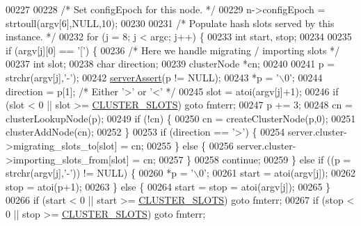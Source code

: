\begin{DoxyCode}
{{00227 
00228         \textcolor{comment}{/* Set configEpoch for this node. */}
00229         n->configEpoch = strtoull(argv[6],NULL,10);
00230 
00231         \textcolor{comment}{/* Populate hash slots served by this instance. */}
00232         \textcolor{keywordflow}{for} (j = 8; j < argc; j++) \{
00233             \textcolor{keywordtype}{int} start, stop;
00234 
00235             \textcolor{keywordflow}{if} (argv[j][0] == \textcolor{stringliteral}{'['}) \{
00236                 \textcolor{comment}{/* Here we handle migrating / importing slots */}
00237                 \textcolor{keywordtype}{int} slot;
00238                 \textcolor{keywordtype}{char} direction;
00239                 clusterNode *cn;
00240 
00241                 p = strchr(argv[j],\textcolor{stringliteral}{'-'});
00242                 \hyperlink{server_8h_a88114b5169b4c382df6b56506285e56a}{serverAssert}(p != NULL);
00243                 *p = \textcolor{stringliteral}{'\(\backslash\)0'};
00244                 direction = p[1]; \textcolor{comment}{/* Either '>' or '<' */}
00245                 slot = atoi(argv[j]+1);
00246                 \textcolor{keywordflow}{if} (slot < 0 || slot >= \hyperlink{cluster_8h_aa3e2cb951eebb16725ecc3f5beefd9fd}{CLUSTER\_SLOTS}) \textcolor{keywordflow}{goto} fmterr;
00247                 p += 3;
00248                 cn = clusterLookupNode(p);
00249                 \textcolor{keywordflow}{if} (!cn) \{
00250                     cn = createClusterNode(p,0);
00251                     clusterAddNode(cn);
00252                 \}
00253                 \textcolor{keywordflow}{if} (direction == \textcolor{stringliteral}{'>'}) \{
00254                     server.cluster->migrating\_slots\_to[slot] = cn;
00255                 \} \textcolor{keywordflow}{else} \{
00256                     server.cluster->importing\_slots\_from[slot] = cn;
00257                 \}
00258                 \textcolor{keywordflow}{continue};
00259             \} \textcolor{keywordflow}{else} \textcolor{keywordflow}{if} ((p = strchr(argv[j],\textcolor{stringliteral}{'-'})) != NULL) \{
00260                 *p = \textcolor{stringliteral}{'\(\backslash\)0'};
00261                 start = atoi(argv[j]);
00262                 stop = atoi(p+1);
00263             \} \textcolor{keywordflow}{else} \{
00264                 start = stop = atoi(argv[j]);
00265             \}
00266             \textcolor{keywordflow}{if} (start < 0 || start >= \hyperlink{cluster_8h_aa3e2cb951eebb16725ecc3f5beefd9fd}{CLUSTER\_SLOTS}) \textcolor{keywordflow}{goto} fmterr;
00267             \textcolor{keywordflow}{if} (stop < 0 || stop >= \hyperlink{cluster_8h_aa3e2cb951eebb16725ecc3f5beefd9fd}{CLUSTER\_SLOTS}) \textcolor{keywordflow}{goto} fmterr;
}}
\end{DoxyCode}
